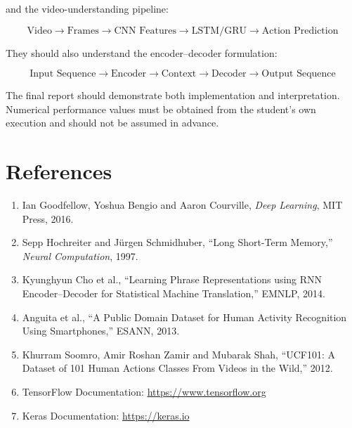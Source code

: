 \documentclass[10pt]{article}
\begin{document}
and the video-understanding pipeline:

\[
\boxed{
\text{Video}
\rightarrow
\text{Frames}
\rightarrow
\text{CNN Features}
\rightarrow
\text{LSTM/GRU}
\rightarrow
\text{Action Prediction}
}
\]

They should also understand the encoder--decoder formulation:

\[
\boxed{
\text{Input Sequence}
\rightarrow
\text{Encoder}
\rightarrow
\text{Context}
\rightarrow
\text{Decoder}
\rightarrow
\text{Output Sequence}
}
\]

The final report should demonstrate both implementation and interpretation.
Numerical performance values must be obtained from the student's own
execution and should not be assumed in advance.

\section{References}

\begin{enumerate}
\item Ian Goodfellow, Yoshua Bengio and Aaron Courville,
\emph{Deep Learning}, MIT Press, 2016.

\item Sepp Hochreiter and Jürgen Schmidhuber,
``Long Short-Term Memory,'' \emph{Neural Computation}, 1997.

\item Kyunghyun Cho et al.,
``Learning Phrase Representations using RNN Encoder--Decoder for Statistical
Machine Translation,'' EMNLP, 2014.

\item Anguita et al.,
``A Public Domain Dataset for Human Activity Recognition Using Smartphones,''
ESANN, 2013.

\item Khurram Soomro, Amir Roshan Zamir and Mubarak Shah,
``UCF101: A Dataset of 101 Human Actions Classes From Videos in the Wild,''
2012.

\item TensorFlow Documentation:
\url{https://www.tensorflow.org}

\item Keras Documentation:
\url{https://keras.io}
\end{enumerate}
\end{document}
